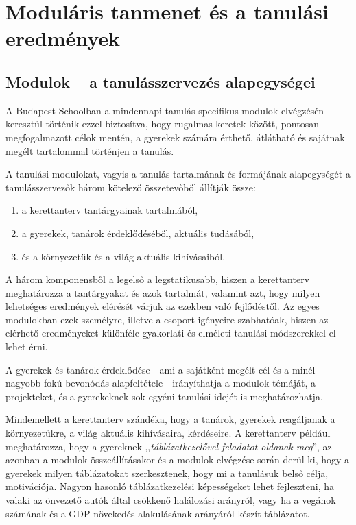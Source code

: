 \section{Moduláris tanmenet és a tanulási eredmények}

\subsection{Modulok -- a tanulásszervezés alapegységei}
\label{sec:modulok}

A Budapest Schoolban a mindennapi tanulás specifikus modulok elvégzésén
keresztül történik ezzel biztosítva, hogy rugalmas keretek között,
pontosan megfogalmazott célok mentén, a gyerekek számára érthető,
átlátható és sajátnak megélt tartalommal történjen a tanulás.

A tanulási modulokat, vagyis a tanulás tartalmának és formájának
alapegységét a tanulásszervezők három kötelező összetevőből állítják
össze:

\begin{enumerate}
  \item
        a kerettanterv tantárgyainak tartalmából,
  \item
        a gyerekek, tanárok érdeklődéséből, aktuális tudásából,
  \item
        és a környezetük és a világ aktuális kihívásaiból.
\end{enumerate}

A három komponensből a legelső a legstatikusabb, hiszen a kerettanterv
meghatározza a tantárgyakat és azok tartalmát, valamint azt, hogy milyen
lehetséges eredmények elérését várjuk az ezekben való fejlődéstől. Az
egyes modulokban ezek személyre, illetve a csoport igényeire szabhatóak,
hiszen az elérhető eredményeket különféle gyakorlati és elméleti
tanulási módszerekkel el lehet érni.

A gyerekek és tanárok érdeklődése - ami a sajátként megélt cél és a
minél nagyobb fokú bevonódás alapfeltétele - irányíthatja a modulok
témáját, a projekteket, és a gyerekeknek sok egyéni tanulási idejét is
meghatározhatja.

Mindemellett a kerettanterv szándéka, hogy a tanárok, gyerekek
reagáljanak a környezetükre, a világ aktuális kihívásaira, kérdéseire. A
kerettanterv például meghatározza, hogy a gyereknek ,,\emph{táblázatkezelővel
  feladatot oldanak meg}'', az azonban a
modulok összeállításakor és a modulok elvégzése során derül ki, hogy a
gyerekek milyen táblázatokat szerkesztenek, hogy mi a tanulásuk belső
célja, motivációja. Nagyon hasonló táblázatkezelési képességeket lehet
fejleszteni, ha valaki az önvezető autók által csökkenő halálozási
arányról, vagy ha a vegánok számának és a GDP növekedés alakulásának
arányáról készít táblázatot.

